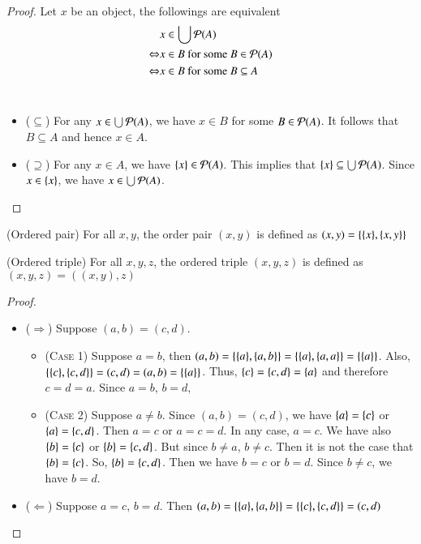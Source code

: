 \begin{proof}
    Let $x$ be an object, the followings are equivalent 
    \begin{align*}
        & x\in \bigcup \mathcal{P}(A)\\
        \Leftrightarrow & x\in B\text{ for some }B\in\mathcal{P}(A)\\
        \Leftrightarrow & x\in B \text{ for some }B\subseteq A
    \end{align*}
    ~
    \begin{itemize}
        \item ($\subseteq$) For any $x\in\bigcup \mathcal{P}(A)$, we have $x\in B$ for some $B\in \mathcal{P}(A)$. It follows that $B\subseteq A$ and hence $x\in A$.
        \item ($\supseteq$) For any $x\in A$, we have $\{x\}\in\mathcal{P}(A)$. This implies that $\{x\}\subseteq \bigcup\mathcal{P}(A)$. Since $x\in\{x\}$, we have $x\in\bigcup \mathcal{P}(A)$.
    \end{itemize}
\end{proof}
\begin{defn}
    {(Ordered pair) For all $x,y$, the order pair $(x,y)$ is defined as $(x,y) = \{\{x\},\{x,y\}\}$}
\end{defn}
\begin{defn}
    {(Ordered triple) For all $x,y,z$, the ordered triple $(x,y,z)$ is defined as $(x,y,z) = ((x,y),z)$}
\end{defn}
\begin{proof}
    ~
    \begin{itemize}
        \item ($\Rightarrow$) Suppose $(a,b) = (c,d)$.
        \begin{itemize}
            \item (\textsc{Case 1}) Suppose $a = b$, then $(a,b) = \{\{a\},\{a,b\}\} = \{\{a\},\{a,a\}\} = \{\{a\}\}$. Also, $\{\{c\},\{c,d\}\} = (c,d) = (a,b) = \{\{a\}\}$. Thus, $\{c\} = \{c,d\} = \{a\}$ and therefore $c = d = a$. Since $a = b$, $b = d$,
            \item (\textsc{Case 2}) Suppose $a\neq b$. Since $(a,b)= (c,d)$, we have $\{a\} = \{c\}$ or $\{a\} = \{c,d\}$. Then $a = c$ or $a = c = d$. In any case, $a = c$. We have also $\{b\} = \{c\}$ or $\{b\} = \{c,d\}$. But since $b\neq a$, $b\neq c$. Then it is not the case that $\{b\} = \{c\}$. So, $\{b\} = \{c,d\}$. Then we have $b = c$ or $ b = d$. Since $b\neq c$, we have $b = d$.
        \end{itemize}
        \item ($\Leftarrow$) Suppose $a = c$, $b = d$. Then $(a,b) = \{\{a\},\{a,b\}\} = \{\{c\}, \{c,d\}\} = (c,d)$
    \end{itemize}
\end{proof}
